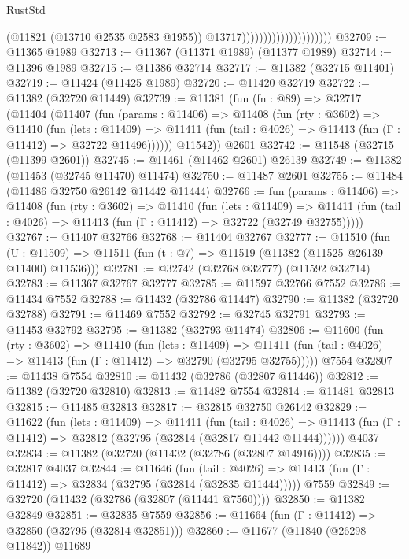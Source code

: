 \begin{lexlean}{RustStd}
\begin{coremodule}
                                              (@11821 (@13710 @2535 @2583 @1955))
                                              @13717)))))))))))))))))))))
@32709 := @11365 @1989
@32713 := @11367 (@11371 @1989) (@11377 @1989)
@32714 := @11396 @1989
@32715 := @11386 @32714
@32717 := @11382 (@32715 @11401)
@32719 := @11424 (@11425 @1989)
@32720 := @11420 @32719
@32722 := @11382 (@32720 @11449)
@32739 := @11381
    (fun (fn : @89) =>
    @32717
      (@11404
        (@11407
          (fun (params : @11406) =>
          @11408
            (fun (rty : @3602) =>
            @11410
              (fun (lets : @11409) =>
              @11411 (fun (tail : @4026) => @11413 (fun (Γ : @11412) => @32722 @11496))))))
        @11542))
    @2601
@32742 := @11548 (@32715 (@11399 @2601))
@32745 := @11461 (@11462 @2601) @26139
@32749 := @11382 (@11453 (@32745 @11470) @11474)
@32750 := @11487 @2601
@32755 := @11484 (@11486 @32750 @26142 @11442 @11444)
@32766 := fun (params : @11406) =>
  @11408
    (fun (rty : @3602) =>
    @11410
      (fun (lets : @11409) =>
      @11411 (fun (tail : @4026) => @11413 (fun (Γ : @11412) => @32722 (@32749 @32755)))))
@32767 := @11407 @32766
@32768 := @11404 @32767
@32777 := @11510
    (fun (U : @11509) => @11511 (fun (t : @7) => @11519 (@11382 (@11525 @26139 @11400) @11536)))
@32781 := @32742 (@32768 @32777) (@11592 @32714)
@32783 := @11367 @32767 @32777
@32785 := @11597 @32766 @7552
@32786 := @11434 @7552
@32788 := @11432 (@32786 @11447)
@32790 := @11382 (@32720 @32788)
@32791 := @11469 @7552
@32792 := @32745 @32791
@32793 := @11453 @32792
@32795 := @11382 (@32793 @11474)
@32806 := @11600
    (fun (rty : @3602) =>
    @11410
      (fun (lets : @11409) =>
      @11411 (fun (tail : @4026) => @11413 (fun (Γ : @11412) => @32790 (@32795 @32755)))))
    @7554
@32807 := @11438 @7554
@32810 := @11432 (@32786 (@32807 @11446))
@32812 := @11382 (@32720 @32810)
@32813 := @11482 @7554
@32814 := @11481 @32813
@32815 := @11485 @32813
@32817 := @32815 @32750 @26142
@32829 := @11622
    (fun (lets : @11409) =>
    @11411
      (fun (tail : @4026) =>
      @11413 (fun (Γ : @11412) => @32812 (@32795 (@32814 (@32817 @11442 @11444))))))
    @4037
@32834 := @11382 (@32720 (@11432 (@32786 (@32807 @14916))))
@32835 := @32817 @4037
@32844 := @11646
    (fun (tail : @4026) => @11413 (fun (Γ : @11412) => @32834 (@32795 (@32814 (@32835 @11444)))))
    @7559
@32849 := @32720 (@11432 (@32786 (@32807 (@11441 @7560))))
@32850 := @11382 @32849
@32851 := @32835 @7559
@32856 := @11664 (fun (Γ : @11412) => @32850 (@32795 (@32814 @32851)))
@32860 := @11677 (@11840 (@26298 @11842)) @11689

\end{coremodule}
\end{lexlean}
